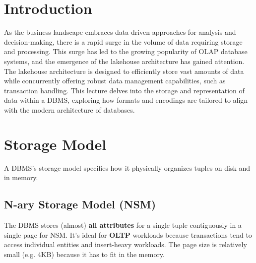 \documentclass[11pt]{article}
\begin{document}
\maketitle
\thispagestyle{plain}

\section{Introduction}

As the business landscape embraces data-driven approaches for analysis and decision-making, there is a rapid surge in the volume of data requiring storage and processing. This surge has led to the growing popularity of OLAP database systems, and the emergence of the lakehouse architecture has gained attention. The lakehouse architecture is designed to efficiently store vast amounts of data while concurrently offering robust data management capabilities, such as transaction handling. This lecture delves into the storage and representation of data within a DBMS, exploring how formats and encodings are tailored to align with the modern architecture of databases.

\section{Storage Model}

A DBMS's storage model specifies how it physically organizes tuples on disk and in memory.


\subsection*{N-ary Storage Model (NSM)}

The DBMS stores (almost) \textbf{all attributes} for a single tuple contiguously in a single page for NSM. It's ideal for \textbf{OLTP} workloads because transactions tend to access individual entities and insert-heavy workloads. The page size is relatively small (e.g. 4KB) because it has to fit in the memory.
\end{document}
